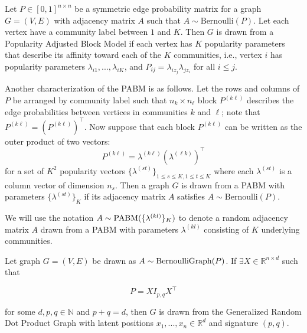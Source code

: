 \documentclass[12pt]{article}
\begin{document}
\begin{definition}
\label{pabm}
Let $P \in [0, 1]^{n \times n}$ be a symmetric edge probability matrix for a
graph $G = (V, E)$ with adjacency matrix $A$ such that $A \sim \mathrm{Bernoulli}(P)$.
Let each vertex have a community label between $1$ and $K$.
Then $G$ is drawn from a Popularity Adjusted Block Model if
each vertex has $K$ popularity parameters that describe its affinity
toward each of the $K$ communities, i.e., vertex $i$ has popularity parameters
$\lambda_{i1}, ..., \lambda_{iK}$, and  $P_{ij} = \lambda_{i z_j}
\lambda_{j z_i}$ for all $i \leq j$. 

Another characterization of the PABM is as follows.
Let the rows and columns of $P$ be arranged by community label
such that $n_k \times n_{\ell}$ block $P^{(k \ell)}$
describes the edge probabilities between vertices in communities
$k$ and $\ell$; note that $P^{(k \ell)} = (P^{(k \ell)})^\top$.
Now suppose that each block $P^{(k \ell)}$ can be written as the outer product of two vectors:
\begin{equation} \label{eq:pabm}
  P^{(k \ell)} = \lambda^{(k \ell)} (\lambda^{(\ell k)})^\top
\end{equation}
for a set of $K^2$ popularity vectors $\{\lambda^{(st)}\}_{1 \leq
  s \leq K, 1 \leq t \leq K}$ where each
$\lambda^{(st)}$ is a column vector of dimension $n_s$. Then a graph $G$
is drawn from a PABM with parameters
$\{\lambda^{(st)}\}_K$ if its adjacency matrix $A$
satisfies $A \sim \mathrm{Bernoulli}(P)$.
\end{definition}

We will use the notation \(A \sim \mathrm{PABM}(\{\lambda^{(kl)}\}_K)\) to denote
a random adjacency matrix \(A\) drawn from a PABM with parameters
\(\lambda^{(kl)}\) consisting of \(K\) underlying communities.

\begin{definition}
\label{grdpg}
Let graph $G = (V, E)$ be drawn as $A \sim \mathrm{BernoulliGraph}(P)$.
If $\exists X \in \mathbb{R}^{n \times d}$ such that

\begin{equation} \label{eq:grdpg}
  P = X I_{p,q} X^\top
\end{equation}

for some $d, p, q \in \mathbb{N}$ and $p + q = d$, then
$G$ is drawn from the Generalized Random Dot Product Graph with latent positions $x_1, ..., x_n \in \mathbb{R}^d$ and signature $(p, q)$.
\end{definition}
\end{document}
